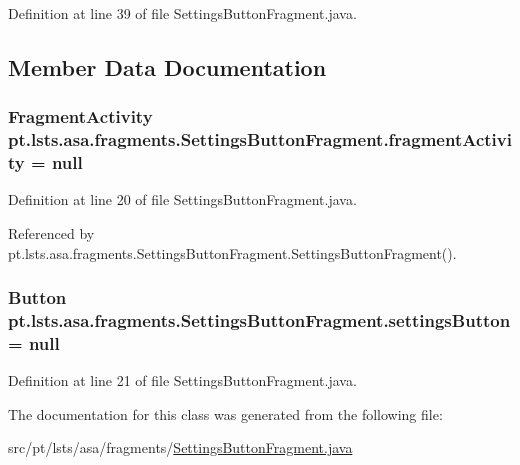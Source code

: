 Definition at line 39 of file Settings\+Button\+Fragment.\+java.



\subsection{Member Data Documentation}
\hypertarget{classpt_1_1lsts_1_1asa_1_1fragments_1_1SettingsButtonFragment_aaeabd1b26ef6599c9b5a60f7baa4515e}{}
\subsubsection[{fragment\+Activity}]{\setlength{\rightskip}{0pt plus 5cm}Fragment\+Activity pt.\+lsts.\+asa.\+fragments.\+Settings\+Button\+Fragment.\+fragment\+Activity = null\hspace{0.3cm}{\ttfamily [private]}}\label{classpt_1_1lsts_1_1asa_1_1fragments_1_1SettingsButtonFragment_aaeabd1b26ef6599c9b5a60f7baa4515e}


Definition at line 20 of file Settings\+Button\+Fragment.\+java.



Referenced by pt.\+lsts.\+asa.\+fragments.\+Settings\+Button\+Fragment.\+Settings\+Button\+Fragment().

\hypertarget{classpt_1_1lsts_1_1asa_1_1fragments_1_1SettingsButtonFragment_a664eb62fa210bdf78ef91838efda3ce1}{}
\subsubsection[{settings\+Button}]{\setlength{\rightskip}{0pt plus 5cm}Button pt.\+lsts.\+asa.\+fragments.\+Settings\+Button\+Fragment.\+settings\+Button = null\hspace{0.3cm}{\ttfamily [private]}}\label{classpt_1_1lsts_1_1asa_1_1fragments_1_1SettingsButtonFragment_a664eb62fa210bdf78ef91838efda3ce1}


Definition at line 21 of file Settings\+Button\+Fragment.\+java.



The documentation for this class was generated from the following file\+:\begin{DoxyCompactItemize}
\item 
src/pt/lsts/asa/fragments/\hyperlink{SettingsButtonFragment_8java}{Settings\+Button\+Fragment.\+java}\end{DoxyCompactItemize}

